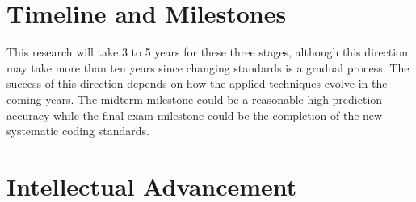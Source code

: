 \documentclass[10pt,conference]{IEEEtran}
\begin{document}
\section{Timeline and Milestones}

This research will take 3 to 5 years for these three stages, although this direction may take more than ten years since changing standards is a gradual process. The success of this direction depends on how the applied techniques evolve in the coming years. The midterm milestone could be a reasonable high prediction accuracy while the final exam milestone could be the completion of the new systematic coding standards.

\section{Intellectual Advancement}

\medskip
%
%

\vspace{12pt}
\color{red}
\end{document}
